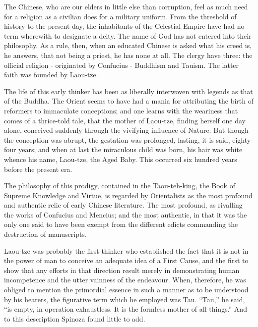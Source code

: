\documentclass[]{book}
\begin{document}
The Chinese, who are our elders in little else than corruption, feel as
much need for a religion as a civilian does for a military uniform. From
the threshold of history to the present day, the inhabitants of the
Celestial Empire have had no term wherewith to designate a deity. The
name of God has not entered into their philosophy. As a rule, then, when
an educated Chinese is asked what his creed is, he answers, that not
being a priest, he has none at all. The clergy have three: the official
religion - originated by Confucius - Buddhism and Tauism. The latter
faith was founded by Laou-tze.

The life of this early thinker has been as liberally interwoven with
legends as that of the Buddha. The Orient seems to have had a mania for
attributing the birth of reformers to immaculate conceptions; and one
learns with the weariness that comes of a thrice-told tale, that the
mother of Laou-tze, finding herself one day alone, conceived suddenly
through the vivifying influence of Nature. But though the conception was
abrupt, the gestation was prolonged, lasting, it is said, eighty-four
years; and when at last the miraculous child was born, his hair was
white whence his name, Laou-tze, the Aged Baby. This occurred six
hundred years before the present era.

The philosophy of this prodigy, contained in the Taou-teh-king, the Book
of Supreme Knowledge and Virtue, is regarded by Orientalists as the most
profound and authentic relic of early Chinese literature. The most
profound, as rivalling the works of Confucius and Mencius; and the most
authentic, in that it was the only one said to have been exempt from the
different edicts commanding the destruction of manuscripts.

Laou-tze was probably the first thinker who established the fact that it
is not in the power of man to conceive an adequate idea of a First
Cause, and the first to show that any efforts in that direction result
merely in demonstrating human incompetence and the utter vainness of the
endeavour. When, therefore, he was obliged to mention the primordial
essence in such a manner as to be understood by his hearers, the
figurative term which he employed was Tau. ``Tau,'' he said, ``is empty,
in operation exhaustless. It is the formless mother of all things.'' And
to this description Spinoza found little to add.
\end{document}
